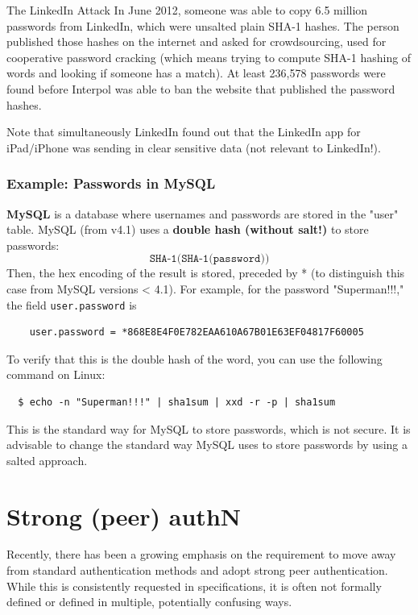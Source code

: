 \begin{casehistory}{The LinkedIn Attack}
	In June 2012, someone was able to copy 6.5 million passwords from LinkedIn, which were unsalted plain SHA-1
	hashes. The person published those hashes on the internet and asked for crowdsourcing, used for cooperative
	password cracking (which means trying to compute SHA-1 hashing of words and looking if someone has a match).
	At least 236,578 passwords were found before Interpol was able to ban the website that published the
	password hashes.

	Note that simultaneously LinkedIn found out that the LinkedIn app for iPad/iPhone was sending in clear sensitive data
	(not relevant to LinkedIn!).
\end{casehistory}

\subsubsection{Example: Passwords in MySQL}
\textbf{MySQL} is a database where usernames and passwords are stored in the "user" table. MySQL (from v4.1) uses a \textbf{double hash (without salt!)} to store passwords:
\[
	\texttt{SHA-1(SHA-1(password))}
\]
Then, the hex encoding of the result is stored, preceded by * (to distinguish this case from MySQL versions < 4.1). For example, for the password "Superman!!!," the field \texttt{user.password} is
\begin{verbatim}
    user.password = *868E8E4F0E782EAA610A67B01E63EF04817F60005
\end{verbatim}
To verify that this is the double hash of the word, you can use the following command on Linux:
\begin{verbatim}
  $ echo -n "Superman!!!" | sha1sum | xxd -r -p | sha1sum
\end{verbatim}
This is the standard way for MySQL to store passwords, which is not secure. It is advisable to change the standard way MySQL uses to store passwords by using a salted approach.


\section{Strong (peer) authN}
Recently, there has been a growing emphasis on the requirement to move away from standard authentication methods and adopt strong peer authentication. While this is consistently requested in specifications, it is often not formally defined or defined in multiple, potentially confusing ways.



